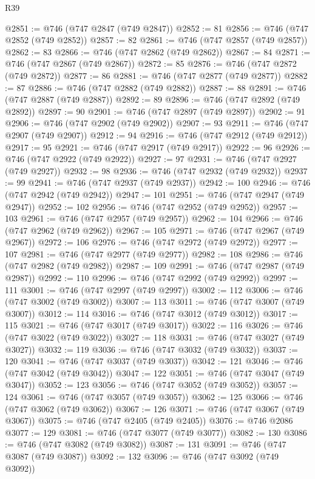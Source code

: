 \begin{lexlean}{R39}
\begin{coremodule}
@2851 := @746 (@747 @2847 (@749 @2847))
@2852 := 81
@2856 := @746 (@747 @2852 (@749 @2852))
@2857 := 82
@2861 := @746 (@747 @2857 (@749 @2857))
@2862 := 83
@2866 := @746 (@747 @2862 (@749 @2862))
@2867 := 84
@2871 := @746 (@747 @2867 (@749 @2867))
@2872 := 85
@2876 := @746 (@747 @2872 (@749 @2872))
@2877 := 86
@2881 := @746 (@747 @2877 (@749 @2877))
@2882 := 87
@2886 := @746 (@747 @2882 (@749 @2882))
@2887 := 88
@2891 := @746 (@747 @2887 (@749 @2887))
@2892 := 89
@2896 := @746 (@747 @2892 (@749 @2892))
@2897 := 90
@2901 := @746 (@747 @2897 (@749 @2897))
@2902 := 91
@2906 := @746 (@747 @2902 (@749 @2902))
@2907 := 93
@2911 := @746 (@747 @2907 (@749 @2907))
@2912 := 94
@2916 := @746 (@747 @2912 (@749 @2912))
@2917 := 95
@2921 := @746 (@747 @2917 (@749 @2917))
@2922 := 96
@2926 := @746 (@747 @2922 (@749 @2922))
@2927 := 97
@2931 := @746 (@747 @2927 (@749 @2927))
@2932 := 98
@2936 := @746 (@747 @2932 (@749 @2932))
@2937 := 99
@2941 := @746 (@747 @2937 (@749 @2937))
@2942 := 100
@2946 := @746 (@747 @2942 (@749 @2942))
@2947 := 101
@2951 := @746 (@747 @2947 (@749 @2947))
@2952 := 102
@2956 := @746 (@747 @2952 (@749 @2952))
@2957 := 103
@2961 := @746 (@747 @2957 (@749 @2957))
@2962 := 104
@2966 := @746 (@747 @2962 (@749 @2962))
@2967 := 105
@2971 := @746 (@747 @2967 (@749 @2967))
@2972 := 106
@2976 := @746 (@747 @2972 (@749 @2972))
@2977 := 107
@2981 := @746 (@747 @2977 (@749 @2977))
@2982 := 108
@2986 := @746 (@747 @2982 (@749 @2982))
@2987 := 109
@2991 := @746 (@747 @2987 (@749 @2987))
@2992 := 110
@2996 := @746 (@747 @2992 (@749 @2992))
@2997 := 111
@3001 := @746 (@747 @2997 (@749 @2997))
@3002 := 112
@3006 := @746 (@747 @3002 (@749 @3002))
@3007 := 113
@3011 := @746 (@747 @3007 (@749 @3007))
@3012 := 114
@3016 := @746 (@747 @3012 (@749 @3012))
@3017 := 115
@3021 := @746 (@747 @3017 (@749 @3017))
@3022 := 116
@3026 := @746 (@747 @3022 (@749 @3022))
@3027 := 118
@3031 := @746 (@747 @3027 (@749 @3027))
@3032 := 119
@3036 := @746 (@747 @3032 (@749 @3032))
@3037 := 120
@3041 := @746 (@747 @3037 (@749 @3037))
@3042 := 121
@3046 := @746 (@747 @3042 (@749 @3042))
@3047 := 122
@3051 := @746 (@747 @3047 (@749 @3047))
@3052 := 123
@3056 := @746 (@747 @3052 (@749 @3052))
@3057 := 124
@3061 := @746 (@747 @3057 (@749 @3057))
@3062 := 125
@3066 := @746 (@747 @3062 (@749 @3062))
@3067 := 126
@3071 := @746 (@747 @3067 (@749 @3067))
@3075 := @746 (@747 @2405 (@749 @2405))
@3076 := @746 @2086
@3077 := 129
@3081 := @746 (@747 @3077 (@749 @3077))
@3082 := 130
@3086 := @746 (@747 @3082 (@749 @3082))
@3087 := 131
@3091 := @746 (@747 @3087 (@749 @3087))
@3092 := 132
@3096 := @746 (@747 @3092 (@749 @3092))

\end{coremodule}
\end{lexlean}
